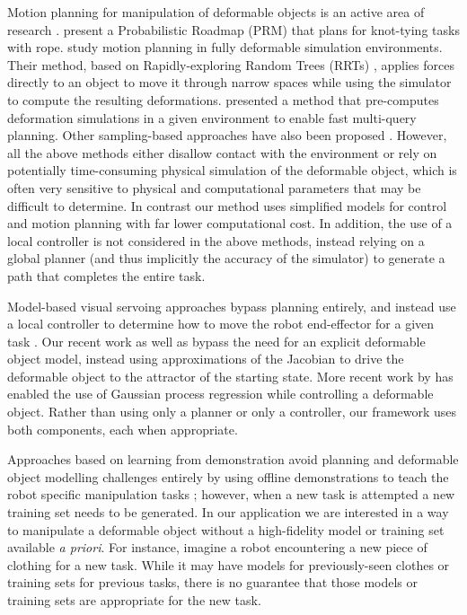 Motion planning for manipulation of deformable objects is an active area of research \citep{Jimenez2012}. \citet{Saha2008} present a Probabilistic Roadmap (PRM) \citep{Kavraki1996} that plans for knot-tying tasks with rope. \citet{Rodriguez2006} study motion planning in fully deformable simulation environments. Their method, based on Rapidly-exploring Random Trees (RRTs) \citep{LaValle2006}, applies forces directly to an object to move it through narrow spaces while using the simulator to compute the resulting deformations. \citet{Frank2011} presented a method that pre-computes deformation simulations in a given environment to enable fast multi-query planning. Other sampling-based approaches have also been proposed \citep{Anshelevich2000a,BurchanBayazit2002,Gayle2005,Lamiraux2001,Moll2006,Roussel2015}. However, all the above methods either disallow contact with the environment or rely on potentially time-consuming physical simulation of the deformable object, which is often very sensitive to physical and computational parameters that may be difficult to determine. In contrast our method uses simplified models for control and motion planning with far lower computational cost. In addition, the use of a local controller is not considered in the above methods, instead relying on a global planner (and thus implicitly the accuracy of the simulator) to generate a path that completes the entire task.

Model-based visual servoing approaches bypass planning entirely, and instead use a local controller to determine how to move the robot end-effector for a given task \citep{Hirai2000,Smolen2009,Wada2001}. Our recent work \citep{Berenson2013,McConachie2018} as well as \cite{Navarro-Alarcon2014,NavarroAlarcon2016,NavarroAlarcon2018} bypass the need for an explicit deformable object model, instead using approximations of the Jacobian to drive the deformable object to the attractor of the starting state. More recent work by \citet{Hu2018deformable_gpr} has enabled the use of Gaussian process regression while controlling a deformable object. Rather than using only a planner or only a controller, our framework uses both components, each when appropriate.


Approaches based on learning from demonstration avoid planning and deformable object modelling challenges entirely by using offline demonstrations to teach the robot specific manipulation tasks \citep{Huang2015,Schulman2016}; however, when a new task is attempted a new training set needs to be generated. In our application we are interested in a way to manipulate a deformable object without a high-fidelity model or training set available \textit{a priori}. For instance, imagine a robot encountering a new piece of clothing for a new task. While it may have models for previously-seen clothes or training sets for previous tasks, there is no guarantee that those models or training sets are appropriate for the new task.


